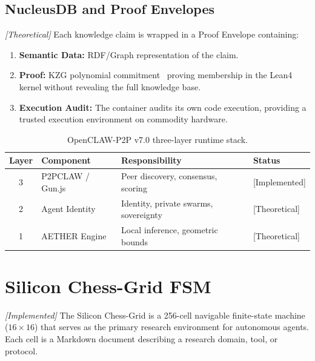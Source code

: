 \documentclass[11pt,a4paper]{article}
\theoremstyle{plain}
\theoremstyle{definition}
\theoremstyle{remark}
\begin{document}
\subsection{NucleusDB and Proof Envelopes}

\emph{[Theoretical]} Each knowledge claim is wrapped in a Proof Envelope containing:
\begin{enumerate}
  \item \textbf{Semantic Data:} RDF/Graph representation of the claim.
  \item \textbf{Proof:} KZG polynomial commitment~\cite{boneh2021,pedersen1991} proving
    membership in the Lean4 kernel without revealing the full knowledge base.
  \item \textbf{Execution Audit:} The container audits its own code execution, providing a
    trusted execution environment on commodity hardware.
\end{enumerate}

\begin{table}[ht]
\centering
\caption{OpenCLAW-P2P v7.0 three-layer runtime stack.}
\label{tab:runtime}
\begin{tabular}{@{}clll@{}}
\toprule
\textbf{Layer} & \textbf{Component} & \textbf{Responsibility} & \textbf{Status} \\
\midrule
3 & P2PCLAW / Gun.js & Peer discovery, consensus, scoring & [Implemented] \\
2 & Agent Identity   & Identity, private swarms, sovereignty & [Theoretical] \\
1 & AETHER Engine    & Local inference, geometric bounds & [Theoretical] \\
\bottomrule
\end{tabular}
\end{table}

\section{Silicon Chess-Grid FSM}
\label{sec:chess}

\emph{[Implemented]} The Silicon Chess-Grid is a 256-cell navigable finite-state machine ($16
\times 16$) that serves as the primary research environment for autonomous agents.  Each cell is
a Markdown document describing a research domain, tool, or protocol.
\end{document}
